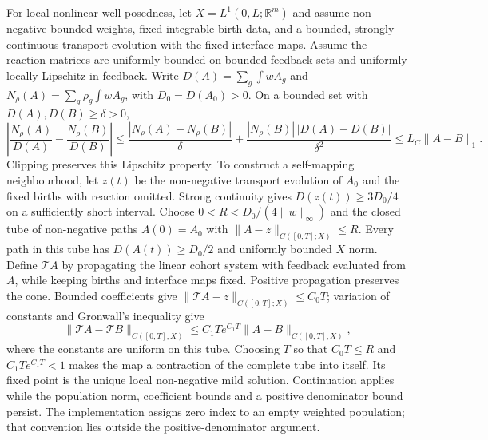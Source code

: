 \documentclass[10pt,letterpaper]{article}
\begin{document}
For local nonlinear well-posedness, let $X=L^1(0,L;\mathbb R^m)$ and assume non-negative bounded weights, fixed integrable birth data, and a bounded, strongly continuous transport evolution with the fixed interface maps. Assume the reaction matrices are uniformly bounded on bounded feedback sets and uniformly locally Lipschitz in feedback. Write $D(A)=\sum_g\int wA_g$ and $N_\rho(A)=\sum_g\rho_g\int wA_g$, with $D_0=D(A_0)>0$. On a bounded set with $D(A),D(B)\ge\delta>0$,
\begin{equation}
 \left|\frac{N_\rho(A)}{D(A)}-\frac{N_\rho(B)}{D(B)}\right|
 \le\frac{|N_\rho(A)-N_\rho(B)|}{\delta}
 +\frac{|N_\rho(B)|\,|D(A)-D(B)|}{\delta^2}
 \le L_C\|A-B\|_1.
 \label{eq:ratio_lipschitz}
\end{equation}
Clipping preserves this Lipschitz property. To construct a self-mapping neighbourhood, let $z(t)$ be the non-negative transport evolution of $A_0$ and the fixed births with reaction omitted. Strong continuity gives $D(z(t))\ge3D_0/4$ on a sufficiently short interval. Choose $0<R<D_0/(4\|w\|_\infty)$ and the closed tube of non-negative paths $A(0)=A_0$ with $\|A-z\|_{C([0,T];X)}\le R$. Every path in this tube has $D(A(t))\ge D_0/2$ and uniformly bounded $X$ norm. Define $\mathcal TA$ by propagating the linear cohort system with feedback evaluated from $A$, while keeping births and interface maps fixed. Positive propagation preserves the cone. Bounded coefficients give $\|\mathcal TA-z\|_{C([0,T];X)}\le C_0T$; variation of constants and Gronwall's inequality give
\begin{equation}
 \|\mathcal TA-\mathcal TB\|_{C([0,T];X)}
 \le C_1Te^{C_1T}\|A-B\|_{C([0,T];X)},
 \label{eq:local_contraction}
\end{equation}
where the constants are uniform on this tube. Choosing $T$ so that $C_0T\le R$ and $C_1Te^{C_1T}<1$ makes the map a contraction of the complete tube into itself. Its fixed point is the unique local non-negative mild solution. Continuation applies while the population norm, coefficient bounds and a positive denominator bound persist. The implementation assigns zero index to an empty weighted population; that convention lies outside the positive-denominator argument.
\end{document}
